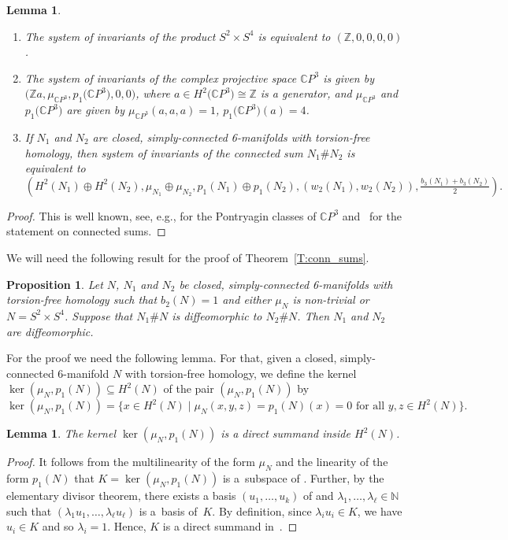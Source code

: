 \documentclass[pdftex]{sigma}
\numberwithin{equation}{section}
\newtheorem{Lemma}[Theorem]{Lemma}
\newtheorem{Proposition}[Theorem]{Proposition}
\theoremstyle{definition}
\numberwithin{table}{section}
\newcommand{\N}{\mathbb{N}}
\newcommand{\Z}{\mathbb{Z}}
\newcommand{\C}{\mathbb{C}}
\begin{document}
\begin{Lemma}\label{L:inv_examples}\qquad
	\begin{enumerate}\itemsep=0pt
		\item[$(1)$] The system of invariants of the product $S^2\times S^4$ is equivalent to $(\Z,0,0,0,0)$.
		\item[$(2)$] The system of invariants of the complex projective space $\C P^3$ is given by $\bigl(\Z a,\mu_{\C P^3},\allowbreak p_1\bigl(\C P^3\bigr),0,0\bigr)$, where $a\in H^2\bigl(\C P^3\bigr)\cong \Z$ is a generator, and $\mu_{\C P^3}$ and $p_1\bigl(\C P^3\bigr)$ are given by
$\mu_{\C P^3}(a,a,a)=1$, $p_1\bigl(\C P^3\bigr)(a)=4$.
		\item[$(3)$] If $N_1$ and $N_2$ are closed, simply-connected 6-manifolds with torsion-free homology, then system of invariants of the connected sum $N_1\# N_2$ is equivalent to
		\[ \left(H^2(N_1)\oplus H^2(N_2),\mu_{N_1}\oplus\mu_{N_2},p_1(N_1)\oplus p_1(N_2),(w_2(N_1),w_2(N_2)),\tfrac{b_3(N_1)+b_3(N_2)}{2}  \right). \]
	\end{enumerate}
\end{Lemma}
\begin{proof}
	This is well known, see, e.g., \cite[Example~15.6]{MS74} for the Pontryagin classes of $\C P^3$ and~\mbox{\cite[Lemma~4.1.4]{Re22}} for the statement on connected sums.
\end{proof}

We will need the following result for the proof of Theorem~\ref{T:conn_sums}.
\begin{Proposition}\label{P:splitting_diffeo}
	Let $N$, $N_1$ and $N_2$ be closed, simply-connected 6-manifolds with torsion-free homology such that $b_2(N)=1$ and either $\mu_N$ is non-trivial or $N=S^2\times S^4$. Suppose that $N_1\# N$ is diffeomorphic to $N_2\# N$. Then $N_1$ and $N_2$ are diffeomorphic.
\end{Proposition}
For the proof we need the following lemma. For that, given a closed, simply-connected 6-manifold $N$ with torsion-free homology, we define the kernel $\ker(\mu_N,p_1(N))\subseteq H^2(N)$ of the pair $(\mu_N,p_1(N))$ by
\[ \ker(\mu_N,p_1(N))=\bigl\{ x\in H^2(N)\mid \mu_{N}(x,y,z)=p_1(N)(x)=0\text{ for all }y,z\in H^2(N)\bigr\}. \]
\begin{Lemma}\label{L:ker_dir_sum}
	The kernel $\ker(\mu_N,p_1(N))$ is a direct summand inside $H^2(N)$.
\end{Lemma}
\begin{proof}
	It follows from the multilinearity of the form $\mu_N$ and the linearity of the form $p_1(N)$ that $K=\ker(\mu_N,p_1(N))$ is a~subspace of . Further, by the elementary divisor theorem, there exists a basis $(u_1,\dots,u_k)$ of  and $\lambda_1,\dots,\lambda_\ell\in \N$ such that $(\lambda_1 u_1,\dots,\lambda_\ell u_\ell)$ is a~basis of~$K$. By definition, since $\lambda_i u_i\in K$, we have $u_i\in K$ and so $\lambda_i=1$. Hence, $K$ is a direct summand in~.
\end{proof}
\end{document}
